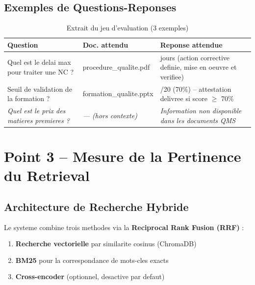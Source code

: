 \documentclass[12pt,a4paper]{article}
\begin{document}
\subsection{Exemples de Questions-Reponses}

\begin{table}[h]
\centering
\caption{Extrait du jeu d'evaluation (3 exemples)}
\small
\begin{tabular}{>{\raggedright}p{4.5cm}
                >{\raggedright}p{3cm}
                >{\raggedright\arraybackslash}p{5cm}}
\toprule
\textbf{Question} & \textbf{Doc. attendu} & \textbf{Reponse attendue} \\
\midrule
Quel est le delai max pour traiter une NC ? &
procedure\_qualite.pdf &
30 jours (action corrective definie, mise en oeuvre et verifiee) \\
\addlinespace
Seuil de validation de la formation ? &
formation\_qualite.pptx &
14/20 (70\%) -- attestation delivree si score $\geq$ 70\% \\
\addlinespace
\textit{Quel est le prix des matieres premieres ?} &
\textit{--- (hors contexte)} &
\textit{Information non disponible dans les documents QMS} \\
\bottomrule
\end{tabular}
\end{table}

\section{Point 3 -- Mesure de la Pertinence du Retrieval}

\subsection{Architecture de Recherche Hybride}

Le systeme combine trois methodes via la \textbf{Reciprocal Rank Fusion (RRF)} :

\begin{enumerate}
  \item \textbf{Recherche vectorielle} par similarite cosinus (ChromaDB)
  \item \textbf{BM25} pour la correspondance de mots-cles exacts
  \item \textbf{Cross-encoder} (optionnel, desactive par defaut)
\end{enumerate}
\end{document}
